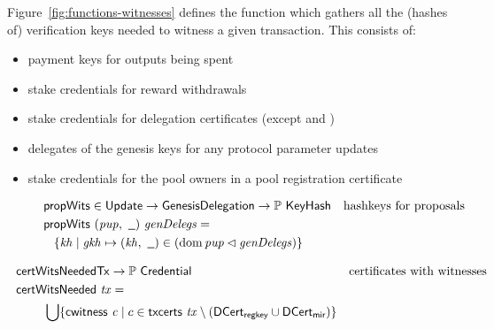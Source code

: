 Figure~\ref{fig:functions-witnesses} defines the function which
gathers all the (hashes of) verification keys needed to witness a given transaction.
This consists of:
\begin{itemize}
  \item payment keys for outputs being spent
  \item stake credentials for reward withdrawals
  \item stake credentials for delegation certificates (except \DCertMir{} and \DCertRegKey{})
  \item delegates of the genesis keys for any protocol parameter updates
  \item stake credentials for the pool owners in a pool registration certificate
\end{itemize}

\begin{figure}[htb]
  \begin{align*}
    & \fun{propWits} \in \Update \to \GenesisDelegation \to \powerset{\KeyHash}
    & \text{hashkeys for proposals} \\
    & \fun{propWits}~(\var{pup},~\wcard)~\var{genDelegs} = \\
    & ~~\left\{
      \var{kh}
      \mid
      \var{gkh}\mapsto(\var{kh},~\wcard)\in
      \left(\dom{\var{pup}}\restrictdom\var{genDelegs}\right)
      \right\}
  \end{align*}

  \begin{align*}
    & \hspace{-0.8cm}\fun{certWitsNeeded} \Tx \to \powerset{\Credential}
    & \text{certificates with witnesses} \\
    &  \hspace{-0.8cm}\fun{certWitsNeeded}~\var{tx} = \\
    & \bigcup\{\cwitness{c} \mid c \in \txcerts{tx} \setminus (\DCertRegKey\cup\DCertMir)\}
  \end{align*}


\end{figure}
